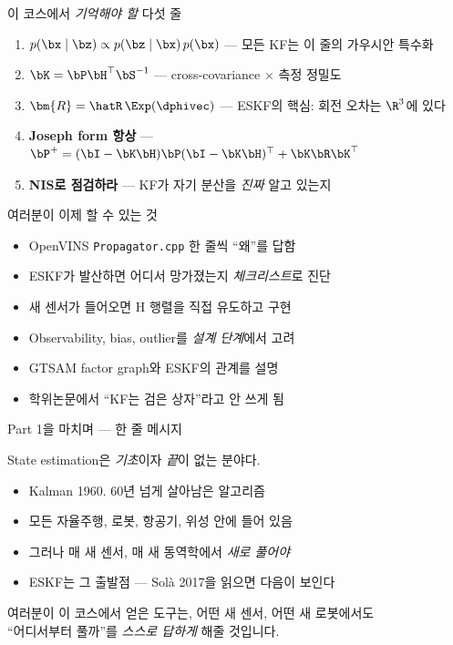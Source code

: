 \begin{frame}{이 코스에서 \emph{기억해야 할} 다섯 줄}
  \begin{enumerate}
    \item \textbf{$p(\bx \mid \bz) \propto p(\bz \mid \bx)\, p(\bx)$} — 모든 KF는 이 줄의 가우시안 특수화
    \item \textbf{$\bK = \bP\bH^\top \bS^{-1}$} — cross-covariance $\times$ 측정 정밀도
    \item \textbf{$\bm{R} = \hatR\,\Exp(\dphivec)$} — ESKF의 핵심: 회전 오차는 $\R^3$에 있다
    \item \textbf{Joseph form 항상} — $\bP^+ = (\bI-\bK\bH)\bP(\bI-\bK\bH)^\top + \bK\bR\bK^\top$
    \item \textbf{NIS로 점검하라} — KF가 자기 분산을 \emph{진짜} 알고 있는지
  \end{enumerate}
\end{frame}

\begin{frame}{여러분이 이제 할 수 있는 것}
  \begin{itemize}
    \item OpenVINS \texttt{Propagator.cpp} 한 줄씩 ``왜''를 답함
    \item ESKF가 발산하면 어디서 망가졌는지 \emph{체크리스트}로 진단
    \item 새 센서가 들어오면 H 행렬을 직접 유도하고 구현
    \item Observability, bias, outlier를 \emph{설계 단계}에서 고려
    \item GTSAM factor graph와 ESKF의 관계를 설명
    \item 학위논문에서 ``KF는 검은 상자''라고 안 쓰게 됨
  \end{itemize}
\end{frame}

\begin{frame}{Part 1을 마치며 — 한 줄 메시지}
  \begin{center}
    \large
    State estimation은 \emph{기초}이자 \emph{끝}이 없는 분야다.
  \end{center}
  \vspace{0.5em}
  \begin{itemize}
    \item Kalman 1960. 60년 넘게 살아남은 알고리즘
    \item 모든 자율주행, 로봇, 항공기, 위성 안에 들어 있음
    \item 그러나 매 새 센서, 매 새 동역학에서 \emph{새로 풀어야}
    \item ESKF는 그 출발점 — Solà 2017을 읽으면 다음이 보인다
  \end{itemize}
  \pause
  \vspace{0.5em}
  여러분이 이 코스에서 얻은 도구는, 어떤 새 센서, 어떤 새 로봇에서도\\
  ``어디서부터 풀까''를 \emph{스스로 답하게} 해줄 것입니다.
\end{frame}

